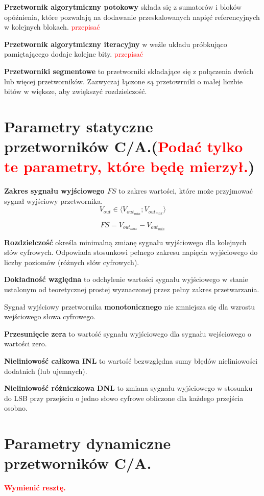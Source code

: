 \documentclass[10pt,a4paper]{report}
\begin{document}
	{	\textbf{Przetwornik algorytmiczny potokowy} składa się z sumatorów i bloków opóźnienia, które pozwalają na dodawanie przeskalowanych napięć referencyjnych w kolejnych blokach. \textcolor{red}{przepisać} }

	{	\textbf{Przetwornik algorytmiczny iteracyjny} w weźle układu próbkująco pamiętającego dodaje kolejne bity. \textcolor{red}{przepisać} }

	{ 	\textbf{Przetworniki segmentowe} to przetworniki składające się z połączenia dwóch lub więcej przetworników. Zazwyczaj łączone są przetowrniki o małej liczbie bitów w większe, aby zwiększyć rozdzielczość. }

	\section{Parametry statyczne przetworników C/A.(\textcolor{red}{Podać tylko te parametry, które będę mierzył.})}
	{	\textbf{Zakres sygnału wyjściowego $FS$} to zakres wartości, które może przyjmować sygnał wyjściowy przetwornika.
		$$
		V_{out} \in \langle V_{out_{min}} ;  V_{out_{max}} \rangle
		$$
		
		$$
		FS = V_{out_{max}} - V_{out_{min}}
		$$	
	}
	
	{	\textbf{Rozdzielczość } określa minimalną zmianę sygnału wyjściowego dla kolejnych słów cyfrowych. Odpowiada stosunkowi pełnego zakresu napięcia wyjściowego do liczby poziomów (różnych słów cyfrowych).
		$$
		
		$$
	}

	{	\textbf{Dokładność względna} to odchylenie wartości sygnału wyjściowego w stanie ustalonym od teoretycznej prostej wyznaczonej przez pełny zakres przetwarzania. }

	{	Sygnał wyjściowy przetwornika \textbf{monotonicznego} nie zmniejsza się dla wzrostu wejściowego słowa cyfrowego. }

	{	\textbf{Przesunięcie zera} to wartość sygnału wyjściowego dla sygnału wejściowego o wartości zero. }

	{ 	\textbf{Nieliniowość całkowa INL} to wartość bezwzględna sumy błędów nieliniowości dodatnich (lub ujemnych).}
	
	{ 	\textbf{Nieliniowość różniczkowa DNL} to zmiana sygnału wyjściowego w stosunku do LSB przy przejściu o jedno słowo cyfrowe obliczone dla każdego przejścia osobno. }

	\section{Parametry dynamiczne przetworników C/A.}
	{ \textbf{\textcolor{red}{Wymienić resztę.}}
	}
\end{document}
